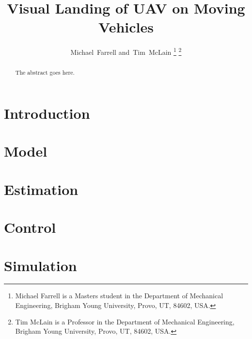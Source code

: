 \documentclass[journal,onecolumn]{IEEEtran}
\begin{document}
\title{Visual Landing of UAV on Moving Vehicles}

\author{Michael~Farrell
        and~Tim~McLain
\thanks{Michael Farrell is a Masters student in the Department of Mechanical
Engineering, Brigham Young University, Provo, UT, 84602, USA.}%
\thanks{Tim McLain is a Professor in the Department of Mechanical
Engineering, Brigham Young University, Provo, UT, 84602, USA.}%
}

\maketitle

\begin{abstract}
The abstract goes here.
\end{abstract}

\section{Introduction}

% 


\section{Model} \label{sec:model}





\section{Estimation} \label{sec:estimation}




% 

\section{Control} \label{sec:control}

\section{Simulation} \label{sec:simulation}

\end{document}
